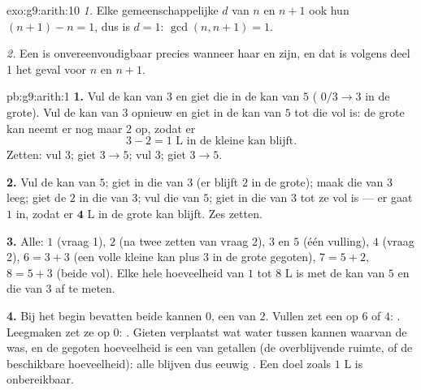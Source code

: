 \begin{solution}{exo:g9:arith:10}
\emph{1.} Elke gemeenschappelijke  $d$ van $n$ en $n+1$  ook hun
 $(n+1) - n = 1$, dus is $d = 1$: $\gcd(n, n+1) = 1$.

\emph{2.} Een  is onvereenvoudigbaar precies wanneer haar  en 
 zijn, en dat is volgens deel 1 het geval voor $n$ en $n + 1$.
\end{solution}

\begin{solution}{pb:g9:arith:1}
\textbf{1.} Vul de kan van $3$ en giet die in de kan van $5$ (
$0/3 \to 3$ in de grote). Vul de kan van $3$ opnieuw en giet in de kan van $5$
tot die vol is: de grote kan neemt er nog maar $2$ op, zodat er
\[
3 - 2 = 1 \text{ L in de kleine kan blijft.}
\]
Zetten: vul $3$; giet $3 \to 5$; vul $3$; giet $3 \to 5$.

\textbf{2.} Vul de kan van $5$; giet in die van $3$ (er blijft $2$ in de grote);
maak die van $3$ leeg; giet de $2$ in die van $3$; vul die van $5$; giet in die
van $3$ tot ze vol is --- er gaat $1$ in, zodat er $\mathbf{4}$ L in de grote kan
blijft. Zes zetten.

\textbf{3.} Alle: $1$ (vraag 1), $2$ (na twee zetten van vraag 2), $3$ en $5$
(één vulling), $4$ (vraag 2), $6 = 3 + 3$ (een volle kleine kan plus $3$ in de
grote gegoten), $7 = 5 + 2$, $8 = 5 + 3$ (beide vol). Elke hele hoeveelheid van
$1$ tot $8$ L is met de kan van $5$ en die van $3$ af te meten.

\textbf{4.} Bij het begin bevatten beide kannen $0$, een  van $2$. Vullen
zet een  op $6$ of $4$: . Leegmaken zet ze op $0$: . Gieten
verplaatst wat water tussen kannen waarvan de   was, en de gegoten
hoeveelheid is een  van  getallen (de overblijvende ruimte, of de
beschikbare hoeveelheid): alle  blijven dus eeuwig . Een  doel
zoals $1$ L is onbereikbaar.


\end{solution}
